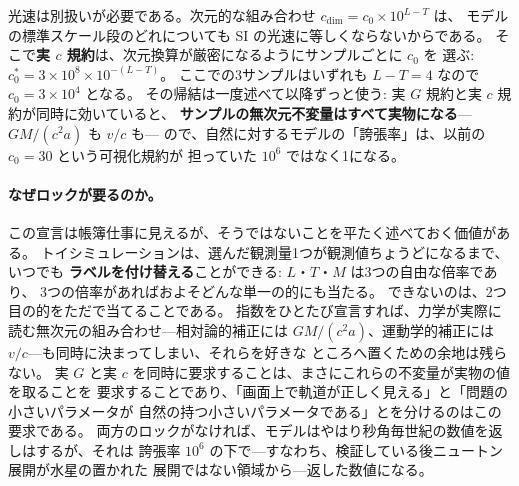\documentclass[a4paper,10pt,twocolumn]{ltjsarticle}
\begin{document}
光速は別扱いが必要である。次元的な組み合わせ $c_{\mathrm{dim}}=c_0\times10^{L-T}$ は、
モデルの標準スケール段のどれについても SI の光速に等しくならないからである。
そこで\textbf{実 $c$ 規約}は、次元換算が厳密になるようにサンプルごとに $c_0$ を
選ぶ: $c_{0}^{*}=3\times10^{8}\times10^{-(L-T)}$。
ここでの3サンプルはいずれも $L-T=4$ なので $c_0=3\times10^{4}$ となる。
その帰結は一度述べて以降ずっと使う: 実 $G$ 規約と実 $c$ 規約が同時に効いていると、
\textbf{サンプルの無次元不変量はすべて実物になる}---$GM/(c^{2}a)$ も $v/c$ も---
ので、自然に対するモデルの「誇張率」は、以前の $c_0=30$ という可視化規約が
担っていた $10^{6}$ ではなく1になる。

\paragraph*{なぜロックが要るのか。}
この宣言は帳簿仕事に見えるが、そうではないことを平たく述べておく価値がある。
トイシミュレーションは、選んだ観測量1つが観測値ちょうどになるまで、いつでも
\textbf{ラベルを付け替える}ことができる: $L$・$T$・$M$ は3つの自由な倍率であり、
3つの倍率があればおよそどんな単一の的にも当たる。
できないのは、2つ目の的をただで当てることである。
指数をひとたび宣言すれば、力学が実際に読む無次元の組み合わせ---相対論的補正には
$GM/(c^{2}a)$、運動学的補正には $v/c$---も同時に決まってしまい、それらを好きな
ところへ置くための余地は残らない。
実 $G$ と実 $c$ を同時に要求することは、まさにこれらの不変量が実物の値を取ることを
要求することであり、「画面上で軌道が正しく見える」と「問題の小さいパラメータが
自然の持つ小さいパラメータである」とを分けるのはこの要求である。
両方のロックがなければ、モデルはやはり秒角毎世紀の数値を返しはするが、それは
誇張率 $10^{6}$ の下で---すなわち、検証している後ニュートン展開が水星の置かれた
展開ではない領域から---返した数値になる。
\end{document}
